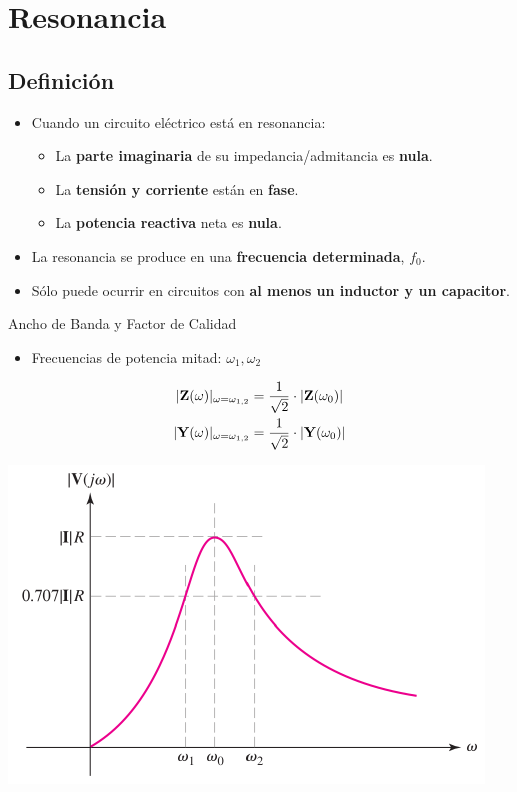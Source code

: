 \section{Resonancia}
\label{sec:org4ff37ef}
\subsection{Definición}
\label{sec:org004e9ed}
\begin{itemize}
\item Cuando un circuito eléctrico está en resonancia:
\begin{itemize}
\item La \textbf{parte imaginaria} de su impedancia/admitancia es \textbf{nula}.
\item La \textbf{tensión y corriente} están en \textbf{fase}.
\item La \textbf{potencia reactiva} neta es \textbf{nula}.
\end{itemize}
\item La resonancia se produce en una \textbf{frecuencia determinada}, \(f_0\).
\item Sólo puede ocurrir en circuitos con \textbf{al menos un inductor y un capacitor}.
\end{itemize}

{Ancho de Banda y Factor de Calidad}

\begin{itemize}
\item Frecuencias de potencia mitad: \(\omega_1, \omega_2\)
\end{itemize}
\begin{align*}
  |\mathbf{Z}(\omega)|_{\omega = \omega_{1,2}} &=  \frac{1}{\sqrt{2}}\cdot |\mathbf{Z}(\omega_0)|\\
  |\mathbf{Y}(\omega)|_{\omega = \omega_{1,2}} &=  \frac{1}{\sqrt{2}}\cdot |\mathbf{Y}(\omega_0)|
\end{align*}
\begin{center}
\includegraphics[width=.9\linewidth]{../figs/CurvaResonancia.pdf}
\end{center}

